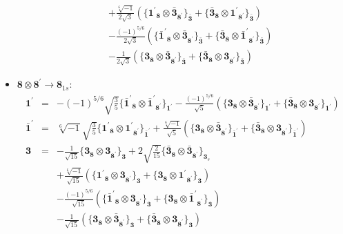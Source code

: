 \documentclass[english]{article}
\newcommand{\subcg}[3]{\big\{ {#1}\otimes{#2}\big\}^{}_{#3}}
\newcommand{\rep}[1]{\mathbf{#1}}
\begin{document}
\begin{itemize}
\begin{eqnarray*}
 & & +\frac{\sqrt[6]{-1}}{2 \sqrt{3}}\left(\subcg{\rep{1^{\prime}}_{\rep{8}}}{\rep{\bar{3}}_{\rep{8^{\prime}}}}{\rep{\bar{3}}}+\subcg{\rep{\bar{3}}_{\rep{8}}}{\rep{1^{\prime}}_{\rep{8^{\prime}}}}{\rep{\bar{3}}}\right) \\ 
 & & -\frac{(-1)^{5/6}}{2 \sqrt{3}}\left(\subcg{\rep{\bar{1}^{\prime}}_{\rep{8}}}{\rep{\bar{3}}_{\rep{8^{\prime}}}}{\rep{\bar{3}}}+\subcg{\rep{\bar{3}}_{\rep{8}}}{\rep{\bar{1}^{\prime}}_{\rep{8^{\prime}}}}{\rep{\bar{3}}}\right) \\ 
 & & -\frac{1}{2 \sqrt{3}}\left(\subcg{\rep{3}_{\rep{8}}}{\rep{\bar{3}}_{\rep{8^{\prime}}}}{\rep{\bar{3}}}+\subcg{\rep{\bar{3}}_{\rep{8}}}{\rep{3}_{\rep{8^{\prime}}}}{\rep{\bar{3}}}\right)
\end{eqnarray*}
\item $\rep{8}\otimes\rep{8^{\prime}}\to\rep{8}_{1s}$:
\begin{eqnarray*}
\rep{1^{\prime}} &=& -(-1)^{5/6} \sqrt{\frac{3}{5}}\subcg{\rep{\bar{1}^{\prime}}_{\rep{8}}}{\rep{\bar{1}^{\prime}}_{\rep{8^{\prime}}}}{\rep{1^{\prime}}}-\frac{(-1)^{5/6}}{\sqrt{5}}\left(\subcg{\rep{3}_{\rep{8}}}{\rep{\bar{3}}_{\rep{8^{\prime}}}}{\rep{1^{\prime}}}+\subcg{\rep{\bar{3}}_{\rep{8}}}{\rep{3}_{\rep{8^{\prime}}}}{\rep{1^{\prime}}}\right)
\\
\rep{\bar{1}^{\prime}} &=& \sqrt[6]{-1} \sqrt{\frac{3}{5}}\subcg{\rep{1^{\prime}}_{\rep{8}}}{\rep{1^{\prime}}_{\rep{8^{\prime}}}}{\rep{\bar{1}^{\prime}}}+\frac{\sqrt[6]{-1}}{\sqrt{5}}\left(\subcg{\rep{3}_{\rep{8}}}{\rep{\bar{3}}_{\rep{8^{\prime}}}}{\rep{\bar{1}^{\prime}}}+\subcg{\rep{\bar{3}}_{\rep{8}}}{\rep{3}_{\rep{8^{\prime}}}}{\rep{\bar{1}^{\prime}}}\right)
\\
\rep{3} &=& -\frac{1}{\sqrt{15}}\subcg{\rep{3}_{\rep{8}}}{\rep{3}_{\rep{8^{\prime}}}}{\rep{3}}+2 \sqrt{\frac{2}{15}}\subcg{\rep{\bar{3}}_{\rep{8}}}{\rep{\bar{3}}_{\rep{8^{\prime}}}}{\rep{3}_{s}} \\ 
 & & +\frac{\sqrt[6]{-1}}{\sqrt{15}}\left(\subcg{\rep{1^{\prime}}_{\rep{8}}}{\rep{3}_{\rep{8^{\prime}}}}{\rep{3}}+\subcg{\rep{3}_{\rep{8}}}{\rep{1^{\prime}}_{\rep{8^{\prime}}}}{\rep{3}}\right) \\ 
 & & -\frac{(-1)^{5/6}}{\sqrt{15}}\left(\subcg{\rep{\bar{1}^{\prime}}_{\rep{8}}}{\rep{3}_{\rep{8^{\prime}}}}{\rep{3}}+\subcg{\rep{3}_{\rep{8}}}{\rep{\bar{1}^{\prime}}_{\rep{8^{\prime}}}}{\rep{3}}\right) \\ 
 & & -\frac{1}{\sqrt{15}}\left(\subcg{\rep{3}_{\rep{8}}}{\rep{\bar{3}}_{\rep{8^{\prime}}}}{\rep{3}}+\subcg{\rep{\bar{3}}_{\rep{8}}}{\rep{3}_{\rep{8^{\prime}}}}{\rep{3}}\right)

\end{eqnarray*}
\end{itemize}
\end{document}

